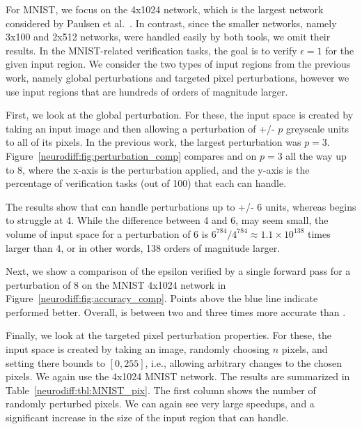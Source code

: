 For MNIST, we focus on the 4x1024 network, which is the largest
network considered by Paulsen et al.~\cite{PaulsenWW20}.  In contrast,
since the smaller networks, namely 3x100 and 2x512 networks, were
handled easily by both tools, we omit their results.
%
In the MNIST-related verification tasks, the goal is to verify
$ \epsilon = 1 $ for the given input region. We consider the two types
of input regions from the previous work, namely global perturbations
and targeted pixel perturbations, however we use input regions that
are hundreds of orders of magnitude larger.

First, we look at the global perturbation. For these, the input space
is created by taking an input image and then allowing a perturbation
of +/- $ p $ greyscale units to all of its pixels. In the previous
work, the largest perturbation was $ p = 3$.
%
Figure~\ref{neurodiff:fig:perturbation_comp} compares \Name{} and \ReluDiffP{}
on $ p = 3 $ all the way up to 8, where the x-axis is the perturbation
applied, and the y-axis is the percentage of verification tasks (out
of 100) that each can handle.


The results show that \Name{} can handle perturbations up to +/-
6 units, whereas \ReluDiffP{} begins to struggle at 4. While the
difference between 4 and 6, may seem small, the volume of input space
for a perturbation of 6 is $ 6^{784}/4^{784} \approx 1.1 \times
10^{138} $ times larger than 4, or in other words, 138 orders of
magnitude larger.


Next, we show a comparison of the epsilon verified by a single forward pass
for a perturbation of 8 on the MNIST 4x1024 network in
Figure~\ref{neurodiff:fig:accuracy_comp}.
Points above the blue line indicate \Name{} performed
better. Overall, \Name{} is between two and three times more accurate
than \ReluDiffP{}.

Finally, we look at the targeted pixel perturbation properties. For
these, the input space is created by taking an image, randomly
choosing $ n $ pixels, and setting there bounds to $ [0,255] $, i.e.,
allowing arbitrary changes to the chosen pixels. We again use the
4x1024 MNIST network. The results are summarized in
Table~\ref{neurodiff:tbl:MNIST_pix}. The first column shows the number of
randomly perturbed pixels. We can again see very large speedups, and a
significant increase in the size of the input region that \Name{} can
handle.


